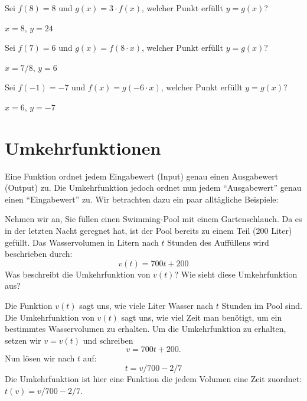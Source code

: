 \begin{exercises}
\begin{exercise}
Sei $f(8) = 8$ und $g(x)=3\cdot f(x)$, welcher Punkt erfüllt $y=g(x)$?
\begin{answer}
$x=8$, $y=24$
\end{answer}
\end{exercise}

\begin{exercise}
Sei $f(7) = 6$ und $g(x)=f(8\cdot x)$, welcher Punkt erfüllt $y=g(x)$?
\begin{answer}
$x=7/8$, $y=6$
\end{answer}
\end{exercise}

\begin{exercise}
Sei $f(-1) = -7$ und $f(x)=g(-6\cdot x)$, welcher Punkt erfüllt
$y=g(x)$?
\begin{answer}
$x=6$, $y=-7$
\end{answer}
\end{exercise}

\end{exercises}

\section{Umkehrfunktionen}
Eine Funktion ordnet jedem Eingabewert (Input) genau einen Ausgabewert (Output) zu. Die Umkehrfunktion jedoch ordnet nun jedem ``Ausgabewert'' genau einen ``Eingabewert'' zu. Wir betrachten dazu ein paar alltägliche Beispiele:

\begin{example}
Nehmen wir an, Sie füllen einen Swimming-Pool mit einem Gartenschlauch. Da es in der letzten Nacht geregnet hat, ist der Pool bereits zu einem Teil (200 Liter) gefüllt. Das Wasservolumen in Litern nach $t$ Stunden des Auffüllens wird beschrieben durch:
\[
v(t) = 700t + 200
\]
Was beschreibt die Umkehrfunktion von $v(t)$? Wie sieht diese Umkehrfunktion aus?
\end{example}


\begin{solution}
Die Funktion $v(t)$ sagt uns, wie viele Liter Wasser nach $t$ Stunden im Pool sind. Die Umkehrfunktion von $v(t)$ sagt uns, wie viel Zeit man benötigt, um ein bestimmtes Wasservolumen zu erhalten.
Um die Umkehrfunktion zu erhalten, setzen wir $v=v(t)$ und schreiben
\[
v = 700t + 200.
\]
Nun lösen wir nach $t$ auf:
\[
t = v/700 - 2/7
\]
Die Umkehrfunktion ist hier eine Funktion die jedem Volumen eine Zeit zuordnet:
$t(v) = v/700-2/7$.
\end{solution}


